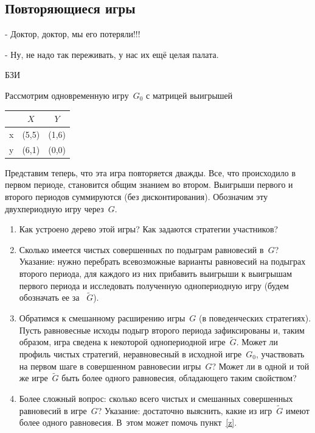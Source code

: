 \subsection{Повторяющиеся игры}
\begin{rem}
- Доктор, доктор, мы его потеряли!!!

- Ну, не надо так переживать, у нас их ещё целая палата.
\end{rem}

\begin{problem}
\begin{source}
БЗИ
\end{source} Рассмотрим одновременную
игру~$G_0$ с матрицей выигрышей

\begin{center}
\begin{tabular}{|c|cc|}
\hline &$X$&$Y$\\ \hline x&(5,5)&(1,6)\\ y&(6,1)&(0,0)\\ \hline
\end{tabular}
\end{center}

Представим теперь, что эта игра повторяется дважды. Все,
что происходило в первом периоде, становится общим знанием
во втором. Выигрыши первого и второго периодов суммируются
(без дисконтирования). Обозначим эту двухпериодную
игру через~$G$.

\begin{enumerate}

\item Как устроено дерево этой игры? Как задаются стратегии
участников?

\item Сколько имеется чистых совершенных по подыграм
равновесий в~$G$? Указание: нужно перебрать всевозможные
варианты равновесий на подыграх второго периода, для каждого
из них прибавить выигрыши к выигрышам первого периода и
исследовать полученную однопериодную игру (будем обозначать
ее за ~$\tilde G$).

\item\label{z} Обратимся к смешанному расширению игры~$G$
(в поведенческих стратегиях). Пусть равновесные исходы
подыгр второго периода зафиксированы и, таким образом, игра
сведена к некоторой однопериодной игре~$\tilde G$. Может ли
профиль чистых стратегий, неравновесный в исходной
игре~$G_0$, участвовать на первом шаге в совершенном
равновесии игры~$G$? Может ли в одной и той же игре~$\tilde
G$ быть более одного равновесия, обладающего таким
свойством?

\item Более сложный вопрос: сколько всего чистых и
смешанных совершенных равновесий в игре~$G$? Указание:
достаточно выяснить, какие из игр~$\tilde G$ имеют более
одного равновесия. В~этом может помочь пункт~\ref{z}.

\end{enumerate}

\begin{sol}

\end{sol}
\end{problem}


